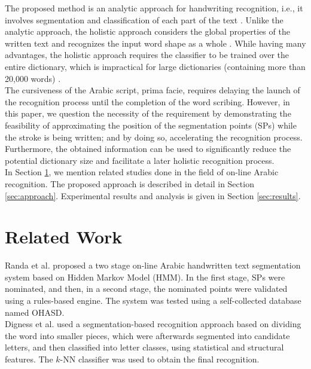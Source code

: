 \documentclass[10pt, conference, compsocconf]{IEEEtran}
\begin{document}
The proposed method is an analytic approach for handwriting recognition, i.e., it involves segmentation and classification of each part of the text \cite{abdulla2008off, sari2002off, Dinges2011}. 
Unlike the analytic approach, the holistic approach considers the global properties of the written text and recognizes the input word shape as a whole \cite{biadsy2011segmentation, saabni2009hierarchical}. While having many advantages, the holistic approach requires the classifier to be trained over the entire dictionary, which is impractical for large dictionaries (containing more than 20,000 words) \cite{elanwar2012unconstrained}.\\

The cursiveness of the Arabic script, prima facie, requires delaying the launch of the recognition process until the completion of the word scribing. 
However, in this paper, we question the necessity of the requirement by demonstrating the feasibility of approximating the position of the segmentation points (SPs) while the stroke is being written; and by doing so, accelerating the recognition process. 
Furthermore, the obtained information can be used to significantly reduce the potential dictionary size and facilitate a later holistic recognition process.\\

In Section \ref{sec:related_work}, we mention related studies done in the field of on-line Arabic recognition. 
The proposed approach is described in detail in Section \ref{sec:approach}. Experimental results and analysis is given in Section \ref{sec:results}. 

\section{Related Work}
\label{sec:related_work}

Randa et al. \cite{elanwar2012unconstrained} proposed a two stage on-line Arabic handwritten text segmentation system based on Hidden Markov Model (HMM). 
In the first stage, SPs were nominated, and then, in a second stage, the nominated points were validated using a rules-based engine. 
The system was tested using a self-collected database named OHASD.\\

Digness et al. \cite{Dinges2011} used a segmentation-based recognition approach based on dividing the word into smaller pieces, which were afterwards segmented into candidate letters, and then classified into letter classes, using statistical and structural features. 
The $k$-NN classifier was used to obtain the final recognition.\\
\end{document}
